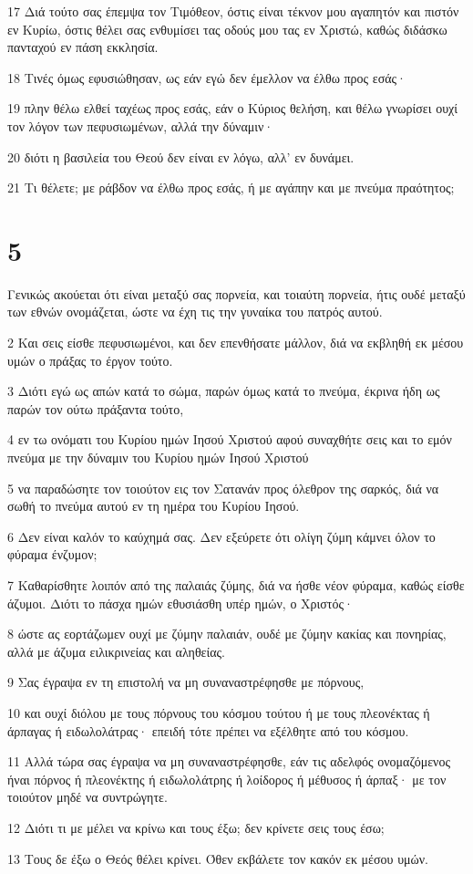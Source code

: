 \par 17 Διά τούτο σας έπεμψα τον Τιμόθεον, όστις είναι τέκνον μου αγαπητόν και πιστόν εν Κυρίω, όστις θέλει σας ενθυμίσει τας οδούς μου τας εν Χριστώ, καθώς διδάσκω πανταχού εν πάση εκκλησία.
\par 18 Τινές όμως εφυσιώθησαν, ως εάν εγώ δεν έμελλον να έλθω προς εσάς·
\par 19 πλην θέλω ελθεί ταχέως προς εσάς, εάν ο Κύριος θελήση, και θέλω γνωρίσει ουχί τον λόγον των πεφυσιωμένων, αλλά την δύναμιν·
\par 20 διότι η βασιλεία του Θεού δεν είναι εν λόγω, αλλ' εν δυνάμει.
\par 21 Τι θέλετε; με ράβδον να έλθω προς εσάς, ή με αγάπην και με πνεύμα πραότητος;

\chapter{5}

\par Γενικώς ακούεται ότι είναι μεταξύ σας πορνεία, και τοιαύτη πορνεία, ήτις ουδέ μεταξύ των εθνών ονομάζεται, ώστε να έχη τις την γυναίκα του πατρός αυτού.
\par 2 Και σεις είσθε πεφυσιωμένοι, και δεν επενθήσατε μάλλον, διά να εκβληθή εκ μέσου υμών ο πράξας το έργον τούτο.
\par 3 Διότι εγώ ως απών κατά το σώμα, παρών όμως κατά το πνεύμα, έκρινα ήδη ως παρών τον ούτω πράξαντα τούτο,
\par 4 εν τω ονόματι του Κυρίου ημών Ιησού Χριστού αφού συναχθήτε σεις και το εμόν πνεύμα με την δύναμιν του Κυρίου ημών Ιησού Χριστού
\par 5 να παραδώσητε τον τοιούτον εις τον Σατανάν προς όλεθρον της σαρκός, διά να σωθή το πνεύμα αυτού εν τη ημέρα του Κυρίου Ιησού.
\par 6 Δεν είναι καλόν το καύχημά σας. Δεν εξεύρετε ότι ολίγη ζύμη κάμνει όλον το φύραμα ένζυμον;
\par 7 Καθαρίσθητε λοιπόν από της παλαιάς ζύμης, διά να ήσθε νέον φύραμα, καθώς είσθε άζυμοι. Διότι το πάσχα ημών εθυσιάσθη υπέρ ημών, ο Χριστός·
\par 8 ώστε ας εορτάζωμεν ουχί με ζύμην παλαιάν, ουδέ με ζύμην κακίας και πονηρίας, αλλά με άζυμα ειλικρινείας και αληθείας.
\par 9 Σας έγραψα εν τη επιστολή να μη συναναστρέφησθε με πόρνους,
\par 10 και ουχί διόλου με τους πόρνους του κόσμου τούτου ή με τους πλεονέκτας ή άρπαγας ή ειδωλολάτρας· επειδή τότε πρέπει να εξέλθητε από του κόσμου.
\par 11 Αλλά τώρα σας έγραψα να μη συναναστρέφησθε, εάν τις αδελφός ονομαζόμενος ήναι πόρνος ή πλεονέκτης ή ειδωλολάτρης ή λοίδορος ή μέθυσος ή άρπαξ· με τον τοιούτον μηδέ να συντρώγητε.
\par 12 Διότι τι με μέλει να κρίνω και τους έξω; δεν κρίνετε σεις τους έσω;
\par 13 Τους δε έξω ο Θεός θέλει κρίνει. Όθεν εκβάλετε τον κακόν εκ μέσου υμών.

